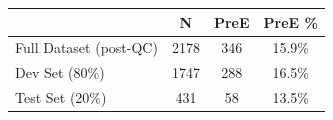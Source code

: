 \documentclass[border=10pt]{standalone}
\begin{document}
\begin{tabular}{lccc}
\toprule
 & \textbf{N} & \textbf{PreE} & \textbf{PreE \%} \\
\midrule
Full Dataset (post-QC) & 2178 & 346 & 15.9\% \\
Dev Set (80\%)         & 1747 & 288 & 16.5\% \\
Test Set (20\%)        & 431  & 58  & 13.5\% \\
\bottomrule
\end{tabular}
\end{document}
